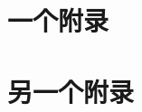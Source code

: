 \cleardoublepage
{

    \appendixsecmajornumbering

    \section{一个附录}


    \section{另一个附录}

    \removeappendixsecmajornumbering
}